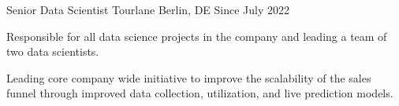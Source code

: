 
\begin{section}[Experience]


  \entry%
    {Senior Data Scientist} %
    {Tourlane} %
    {Berlin, DE} %
    {Since July 2022} %
    {%
    \begin{entrylist}
      \item Responsible for all data science projects in the company and leading a team of two data scientists.
      \item Leading core company wide initiative to improve the scalability of the sales funnel through improved data collection, utilization, and live prediction models.
    \end{entrylist}
    }%


\end{section}
